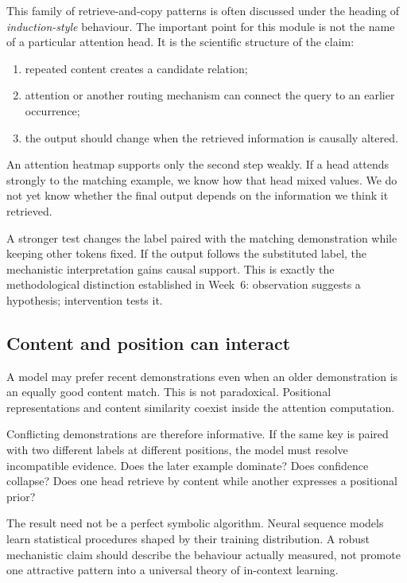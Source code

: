 This family of retrieve-and-copy patterns is often discussed under the heading of \emph{induction-style} behaviour. The important point for this module is not the name of a particular attention head. It is the scientific structure of the claim:
\begin{enumerate}[leftmargin=*]
  \item repeated content creates a candidate relation;
  \item attention or another routing mechanism can connect the query to an earlier occurrence;
  \item the output should change when the retrieved information is causally altered.
\end{enumerate}

An attention heatmap supports only the second step weakly. If a head attends strongly to the matching example, we know how that head mixed values. We do not yet know whether the final output depends on the information we think it retrieved.

A stronger test changes the label paired with the matching demonstration while keeping other tokens fixed. If the output follows the substituted label, the mechanistic interpretation gains causal support. This is exactly the methodological distinction established in Week~6: observation suggests a hypothesis; intervention tests it.

\subsection{Content and position can interact}

A model may prefer recent demonstrations even when an older demonstration is an equally good content match. This is not paradoxical. Positional representations and content similarity coexist inside the attention computation.

Conflicting demonstrations are therefore informative. If the same key is paired with two different labels at different positions, the model must resolve incompatible evidence. Does the later example dominate? Does confidence collapse? Does one head retrieve by content while another expresses a positional prior?

The result need not be a perfect symbolic algorithm. Neural sequence models learn statistical procedures shaped by their training distribution. A robust mechanistic claim should describe the behaviour actually measured, not promote one attractive pattern into a universal theory of in-context learning.

